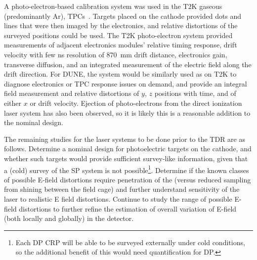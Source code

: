 A photo-electron-based calibration system was used in the T2K gaseous (predominantly Ar), TPCs~\cite{Abgrall:2010hi}. Targets placed on the cathode provided dots and lines that were then imaged by the electronics, and relative distortions of the surveyed positions could be used. The T2K photo-electron system provided measurements of adjacent electronics modules' relative timing response, drift velocity with few \si{\nano\s} resolution of \SI{870}{\milli\m} drift distance, electronics gain, transverse diffusion, and an integrated measurement of the electric field along the drift direction. For DUNE, the system would be similarly used as on T2K to diagnose electronics or TPC response issues on demand, and provide an integral field measurement and relative distortions of $y$, $z$ positions with time, and of either $x$ or drift velocity. Ejection of photo-electrons from the direct ionization laser system has also been observed, so it is likely this is a reasonable addition to the nominal design.%

The remaining studies for the laser systems to be done prior to the TDR are as follows.
 Determine a nominal design for photoelectric targets on the cathode, and whether such targets would provide sufficient survey-like information, given that a (cold) survey of the SP system is not possible\footnote{Each DP CRP will be able to be surveyed externally under cold conditions, so the additional benefit of this would need quantification for DP.}. Determine if the known classes of possible E-field distortions require penetration of the  (versus reduced sampling from shining between the field cage) and further understand sensitivity of the laser to realistic E field distortions. Continue to study the range of possible E-field distortions to further refine the estimation of overall variation of E-field (both locally and globally) in the detector. 


